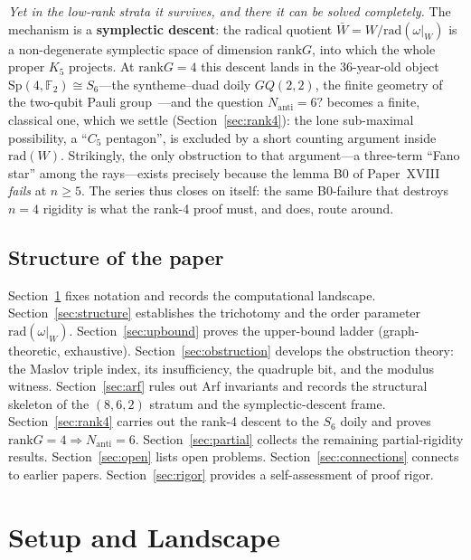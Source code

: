 \documentclass[11pt,a4paper]{article}
\theoremstyle{remark}
\newcommand{\Sp}{\mathrm{Sp}}
\newcommand{\rad}{\mathrm{rad}}
\newcommand{\rank}{\mathrm{rank}}
\newcommand{\Nanti}{N_{\mathrm{anti}}}
\begin{document}
\emph{Yet in the low-rank strata it survives, and there it can be solved completely.}
The mechanism is a \textbf{symplectic descent}: the radical quotient
$\bar W=W/\rad(\omega|_W)$ is a non-degenerate symplectic space of dimension $\rank G$,
into which the whole proper $K_5$ projects. At $\rank G=4$ this descent lands in the
$36$-year-old object $\Sp(4,\mathbb F_2)\cong S_6$---the syntheme--duad doily
$GQ(2,2)$, the finite geometry of the two-qubit Pauli group~\cite{SanigaPlanat,VeldkampTwoQubits}---and the question $\Nanti=6?$ becomes a finite, classical one, which we
settle (Section~\ref{sec:rank4}): the lone sub-maximal possibility, a ``$C_5$ pentagon'',
is excluded by a short counting argument inside $\rad(W)$. Strikingly, the only
obstruction to that argument---a three-term ``Fano star'' among the rays---exists
precisely because the lemma B0 of Paper~XVIII \emph{fails} at $n\ge5$. The series thus
closes on itself: the same B0-failure that destroys $n=4$ rigidity is what the rank-4
proof must, and does, route around.

\subsection*{Structure of the paper}

Section~\ref{sec:setup} fixes notation and records the computational landscape.
Section~\ref{sec:structure} establishes the trichotomy and the order parameter
$\rad(\omega|_W)$.
Section~\ref{sec:upbound} proves the upper-bound ladder (graph-theoretic, exhaustive).
Section~\ref{sec:obstruction} develops the obstruction theory: the Maslov triple index,
its insufficiency, the quadruple bit, and the modulus witness.
Section~\ref{sec:arf} rules out Arf invariants and records the structural skeleton of
the $(8,6,2)$ stratum and the symplectic-descent frame.
Section~\ref{sec:rank4} carries out the rank-4 descent to the $S_6$ doily and proves
$\rank G=4\Rightarrow\Nanti=6$.
Section~\ref{sec:partial} collects the remaining partial-rigidity results.
Section~\ref{sec:open} lists open problems.
Section~\ref{sec:connections} connects to earlier papers.
Section~\ref{sec:rigor} provides a self-assessment of proof rigor.

\section{Setup and Landscape}\label{sec:setup}
\end{document}
